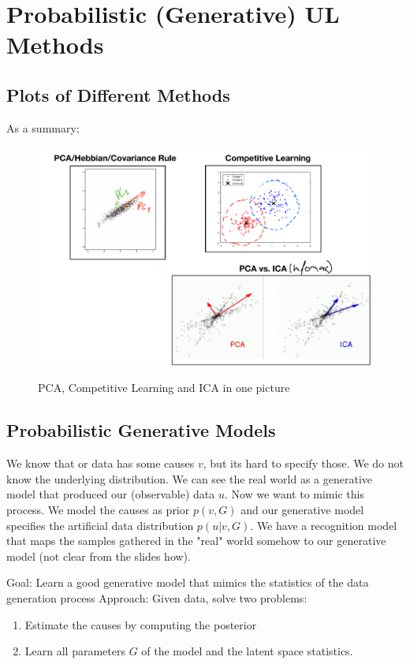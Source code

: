 \documentclass[main]{subfiles}
\begin{document}
\section{Probabilistic (Generative) UL Methods}
\subsection{Plots of Different Methods}
As a summary:
\begin{figure}[H]
	\centering
	\includegraphics[width=0.9\linewidth]{07_UnsupervisedAndSelfsupervisedLearning/figures/summary-clustering.png}
	\label{fig:summary-clustering}
	\caption{PCA, Competitive Learning and ICA in one picture}
\end{figure}

\subsection{Probabilistic Generative Models}
We know that or data has some causes $v$, but its hard to specify those. We do not know the underlying distribution. We can see the real world as a generative model that produced our (observable) data $u$. Now we want to mimic this process. We model the causes as prior $p(v,G)$ and our generative model specifies the artificial data distribution $p(u|v,G)$. We have a recognition model that maps the samples gathered in the "real" world somehow to our generative model (not clear from the slides how).


Goal: Learn a good generative model that mimics the statistics of the data generation process
Approach: Given data, solve two problems:

\begin{enumerate}
    \item Estimate the causes by computing the posterior
    \item Learn all parameters $G$ of the model and the latent space statistics.
\end{enumerate}
\end{document}
